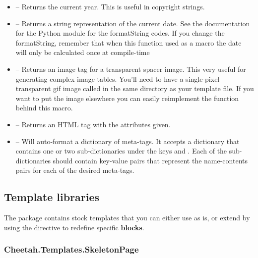 \begin{itemize}
\item {\bf {}} -- Returns the current year. This is useful in
     copyright strings.
\item {\bf {}} -- Returns a string
   representation of the current date. See the documentation for the Python
    module for the formatString codes. If you change the
   formatString, remember that when this function used as a macro the date
   will only be calculated once at compile-time
\item {\bf {}} -- Returns an image tag for a
     transparent spacer image. This very useful for generating complex image
     tables. You'll need to have a single-pixel transparent gif image called
      in the same directory as your template file.  If you want
     to put the image elsewhere you can easily reimplement the function behind
     this macro.
\item {\bf {}} -- Returns an HTML tag
     with the attributes given.
     
\item {\bf {}} -- Will auto-format a dictionary of
     meta-tags.  It accepts a dictionary that contains one or two
     sub-dictionaries under the keys  and . Each of
     the sub-dictionaries should contain key-value pairs that represent the
     name-contents pairs for each of the desired meta-tags.
\end{itemize}
            

\subsection{Template libraries}
\label{libraries.templates}

The  package contains stock templates that you can
either use as is, or extend by using the  directive to redefine
specific {\bf blocks}.

\subsubsection{Cheetah.Templates.SkeletonPage}
\label{libraries.templates.skeletonPage}

